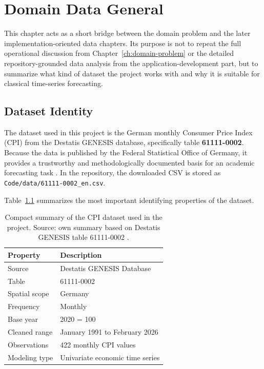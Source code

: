 %
%
%

\chapter{Domain Data General}
\label{ch:domain-data-general}

This chapter acts as a short bridge between the domain problem and the later implementation-oriented data chapters. Its purpose is not to repeat the full operational discussion from Chapter~\ref{ch:domain-problem} or the detailed repository-grounded data analysis from the application-development part, but to summarize what kind of dataset the project works with and why it is suitable for classical time-series forecasting.

\section{Dataset Identity}

The dataset used in this project is the German monthly Consumer Price Index (CPI) from the Destatis GENESIS database, specifically table \textbf{61111-0002}. Because the data is published by the Federal Statistical Office of Germany, it provides a trustworthy and methodologically documented basis for an academic forecasting task \cite{DestatisCPIQuality2023,DestatisCPIWeighting2023}. In the repository, the downloaded CSV is stored as \texttt{Code/data/61111-0002\_en.csv}.

Table~\ref{tab:cpi-source-summary} summarizes the most important identifying properties of the dataset.

\begin{table}[htbp]
	\centering
	\caption{Compact summary of the CPI dataset used in the project. Source: own summary based on Destatis GENESIS table 61111-0002 \cite{DestatisCPIQuality2023,DestatisCPIWeighting2023}.}
	\label{tab:cpi-source-summary}
	\begin{tabular}{ll}
		\hline
		Property & Description \\
		\hline
		Source & Destatis GENESIS Database \\
		Table & 61111-0002 \\
		Spatial scope & Germany \\
		Frequency & Monthly \\
		Base year & 2020 = 100 \\
		Cleaned range & January 1991 to February 2026 \\
		Observations & 422 monthly CPI values \\
		Modeling type & Univariate economic time series \\
		\hline
	\end{tabular}
\end{table}

